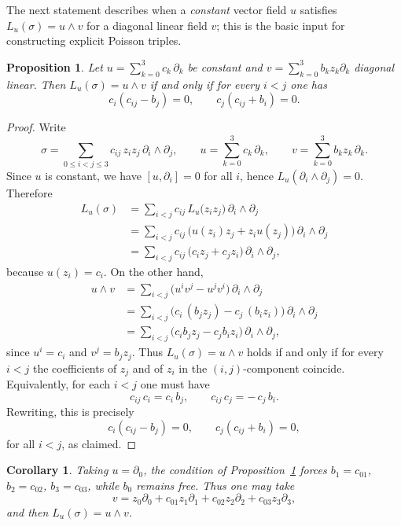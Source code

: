 \documentclass[11pt]{amsart}
\theoremstyle{plain}
\newtheorem{proposition}[theorem]{Proposition}
\newtheorem{corollary}[theorem]{Corollary}
\theoremstyle{definition}
\theoremstyle{definition}
\begin{document}
The next statement describes when a \emph{constant} vector field $u$ satisfies $L_u(\sigma)=u\wedge v$ for a diagonal
linear field $v$; this is the basic input for constructing explicit Poisson triples.

\begin{proposition}\label{prop:Lu=uw}
Let $u=\sum_{k=0}^3 c_k\,\partial_k$ be constant and $v=\sum_{k=0}^3 b_k z_k\partial_k$ diagonal linear.
Then $L_u(\sigma)=u\wedge v$ if and only if for every $i<j$ one has
$$
c_i(c_{ij}-b_j)=0,
\qquad
c_j(c_{ij}+b_i)=0.
$$
\end{proposition}
\begin{proof}
Write
$$
\sigma=\sum_{0\le i<j\le 3} c_{ij}\,z_i z_j\,\partial_i\wedge\partial_j,
\qquad
u=\sum_{k=0}^3 c_k\,\partial_k,
\qquad
v=\sum_{k=0}^3 b_k z_k\,\partial_k.
$$
Since $u$ is constant, we have $[u,\partial_i]=0$ for all $i$, hence
$L_u(\partial_i\wedge\partial_j)=0$. Therefore
\begin{align*}
L_u(\sigma)
&=\sum_{i<j} c_{ij}\,L_u\bigl(z_i z_j\bigr)\,\partial_i\wedge\partial_j \\
&=\sum_{i<j} c_{ij}\,\bigl(u(z_i)z_j+z_i u(z_j)\bigr)\,\partial_i\wedge\partial_j \\
&=\sum_{i<j} c_{ij}\,\bigl(c_i z_j+c_j z_i\bigr)\,\partial_i\wedge\partial_j,
\end{align*}
because $u(z_i)=c_i$.
On the other hand,
\begin{align*}
u\wedge v
&=\sum_{i<j}\bigl(u^i v^j-u^j v^i\bigr)\,\partial_i\wedge\partial_j \\
&=\sum_{i<j}\bigl(c_i\,(b_j z_j)-c_j\,(b_i z_i)\bigr)\,\partial_i\wedge\partial_j \\
&=\sum_{i<j}\bigl(c_i b_j z_j-c_j b_i z_i\bigr)\,\partial_i\wedge\partial_j,
\end{align*}
since $u^i=c_i$ and $v^j=b_j z_j$.
Thus $L_u(\sigma)=u\wedge v$ holds if and only if for every $i<j$ the coefficients of $z_j$ and of $z_i$
in the $(i,j)$-component coincide. Equivalently, for each $i<j$ one must have
$$
c_{ij}\,c_i = c_i\,b_j,
\qquad
c_{ij}\,c_j = -\,c_j\,b_i.
$$
Rewriting, this is precisely
$$
c_i(c_{ij}-b_j)=0,
\qquad
c_j(c_{ij}+b_i)=0,
$$
for all $i<j$, as claimed.
\end{proof}

\begin{corollary}\label{cor:u=partial0}
Taking $u=\partial_0$, the condition of Proposition~\ref{prop:Lu=uw} forces
$b_1=c_{01}$, $b_2=c_{02}$, $b_3=c_{03}$, while $b_0$ remains free. Thus one may take
$$
v=z_0\partial_0+c_{01}z_1\partial_1+c_{02}z_2\partial_2+c_{03}z_3\partial_3,
$$
and then $L_u(\sigma)=u\wedge v$.
\end{corollary}
\end{document}
